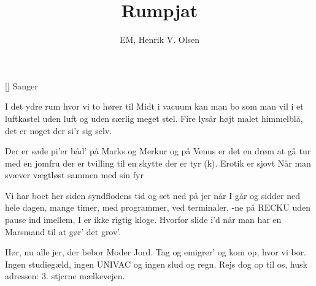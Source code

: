 \documentclass[a4paper,11pt]{article}
\title{Rumpjat}
\author{EM, Henrik V. Olsen}
\begin{document}
\maketitle

\begin{roles}
[] Sanger
\end{roles}

\begin{song}
I det ydre rum
hvor vi to hører til
Midt i vacuum
kan man bo som man vil
i et luftkastel
uden luft og uden særlig meget stel.
Fire lysår højt
malet himmelblå, det er noget der si'r sig selv.

Der er søde pi'er
båd' på Marks og Merkur
og på Venus er
det en drøm at gå tur
med en jomfru
der er tvilling til en skytte der er tyr (k).
Erotik er sjovt
Når man svæver vægtløst sammen med sin fyr

Vi har boet her
siden syndflodens tid
og set ned på jer
når I går og sidder ned
hele dagen, mange timer, med programmer, ved terminaler, -ne på RECKU
uden pause ind imellem, I er ikke rigtig kloge.
Hvorfor slide i'd
når man har en Marsmand til at gør' det grov'.

Hør, nu alle jer,
der bebor Moder Jord.
Tag og emigrer'
og kom op, hvor vi bor.
Ingen studiegæld,
ingen UNIVAC og ingen slud og regn.
Rejs dog op til os,
husk adressen: 3. stjerne mælkevejen.
\end{song}
\end{document}
